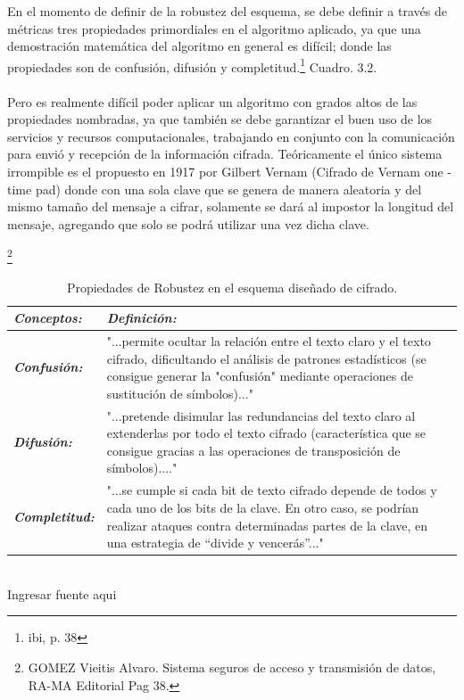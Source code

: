 \documentclass[a4paper,openright,12pt]{book}
\theoremstyle{definition}
\theoremstyle{remark}
\begin{document}
En el momento de definir de la robustez del esquema, se debe definir a través de métricas tres propiedades primordiales en el algoritmo aplicado, ya que una demostración matemática del algoritmo en general es difícil; donde las propiedades son de confusión, difusión y completitud.\footnote{ibi, p. 38} Cuadro. 3.2.\\\\
Pero es realmente difícil poder aplicar un algoritmo con grados altos de las propiedades nombradas, ya que también se debe garantizar el buen uso de los servicios y recursos computacionales, trabajando en conjunto con la comunicación para envió y recepción de la información cifrada. Teóricamente el único sistema irrompible es el propuesto en 1917 por Gilbert Vernam (Cifrado de Vernam one - time pad) donde con una sola clave que se genera de manera aleatoria y del mismo tamaño del mensaje a cifrar, solamente se dará al impostor la longitud del mensaje, agregando que solo se podrá utilizar una vez dicha clave.

\begin{table}[htb]
\centering
\caption{Propiedades de Robustez en el esquema diseñado de cifrado.}\footnote{GOMEZ Vieitis Alvaro. Sistema seguros de acceso y transmisión de datos, RA-MA Editorial Pag 38.}
\begin{tabular}{>{\centering\arraybackslash}m{3cm} >{\arraybackslash}m{9cm} }
\hline
\textbf{\textit{Conceptos:}} & \textbf{\textit{Definición:}} \\ \hline
\textbf{\textit{Confusión:}} & "...permite ocultar la relación entre el texto claro y el texto cifrado, dificultando el análisis de patrones estadísticos (se consigue generar la "confusión" mediante operaciones de sustitución de símbolos)..." \\ \hline
\textbf{\textit{Difusión:}} & "...pretende disimular las redundancias del texto claro al extenderlas por todo el texto cifrado (característica que se consigue gracias a las operaciones de transposición de símbolos)...." \\ \hline
\textbf{\textit{Completitud:}} & "...se cumple si cada bit de texto cifrado depende de todos y cada uno de los bits de la clave. En otro caso, se podrían realizar ataques contra determinadas partes de la clave, en una estrategia de “divide y vencerás”..." \\ \hline
\end{tabular}
\label{tabla:RobustezPropiedades}
\\Ingresar fuente aqui
\end{table}
\end{document}
